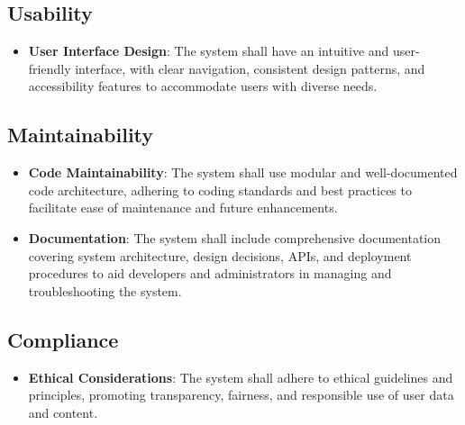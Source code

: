 \documentclass{article}
\begin{document}
\subsection{Usability}
\begin{itemize}[label=$\bullet$]
    \item \textbf{User Interface Design}: The system shall have an intuitive and user-friendly interface, with clear navigation, consistent design patterns, and accessibility features to accommodate users with diverse needs.
\end{itemize}

\subsection{Maintainability}
\begin{itemize}[label=$\bullet$]
    \item \textbf{Code Maintainability}: The system shall use modular and well-documented code architecture, adhering to coding standards and best practices to facilitate ease of maintenance and future enhancements.
    \item \textbf{Documentation}: The system shall include comprehensive documentation covering system architecture, design decisions, APIs, and deployment procedures to aid developers and administrators in managing and troubleshooting the system.
\end{itemize}

\subsection{Compliance}
\begin{itemize}[label=$\bullet$]
    \item \textbf{Ethical Considerations}: The system shall adhere to ethical guidelines and principles, promoting transparency, fairness, and responsible use of user data and content.
\end{itemize}
\end{document}
